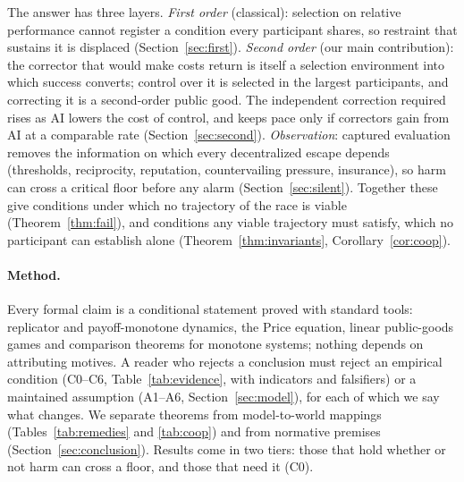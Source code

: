 \documentclass[letterpaper]{article} %
\theoremstyle{definition}
\begin{document}
The answer has three layers. \emph{First order} (classical): selection on relative performance cannot register a condition every participant shares, so restraint that sustains it is displaced (Section~\ref{sec:first}). \emph{Second order} (our main contribution): the corrector that would make costs return is itself a selection environment into which success converts; control over it is selected in the largest participants, and correcting it is a second-order public good. The independent correction required rises as AI lowers the cost of control, and keeps pace only if correctors gain from AI at a comparable rate (Section~\ref{sec:second}). \emph{Observation}: captured evaluation removes the information on which every decentralized escape depends (thresholds, reciprocity, reputation, countervailing pressure, insurance), so harm can cross a critical floor before any alarm (Section~\ref{sec:silent}). Together these give conditions under which no trajectory of the race is viable (Theorem~\ref{thm:fail}), and conditions any viable trajectory must satisfy, which no participant can establish alone (Theorem~\ref{thm:invariants}, Corollary~\ref{cor:coop}).

\paragraph{Method.} Every formal claim is a conditional statement proved with standard tools: replicator and payoff-monotone dynamics, the Price equation, linear public-goods games and comparison theorems for monotone systems; nothing depends on attributing motives. A reader who rejects a conclusion must reject an empirical condition (C0--C6, Table~\ref{tab:evidence}, with indicators and falsifiers) or a maintained assumption (A1--A6, Section~\ref{sec:model}), for each of which we say what changes. We separate theorems from model-to-world mappings (Tables~\ref{tab:remedies} and \ref{tab:coop}) and from normative premises (Section~\ref{sec:conclusion}). Results come in two tiers: those that hold whether or not harm can cross a floor, and those that need it (C0).
\end{document}
